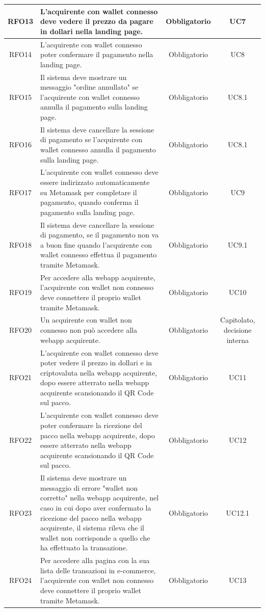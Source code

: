 \documentclass[a4paper, 12pt]{article}
\begin{document}
\begin{longtable}{|c|p{5cm}|c|c|}
\hline
RFO13 & L'acquirente con wallet connesso deve vedere il prezzo da pagare in dollari nella landing page. & Obbligatorio & UC7 \\
\hline
RFO14 & L'acquirente con wallet connesso poter confermare il pagamento nella landing page. & Obbligatorio & UC8 \\
\hline
RFO15 & Il sistema deve mostrare un messaggio "ordine annullato" se l'acquirente con wallet connesso annulla il pagamento sulla landing page. & Obbligatorio & UC8.1 \\
\hline
RFO16 & Il sistema deve cancellare la sessione di pagamento se l'acquirente con wallet connesso annulla il pagamento sulla landing page. & Obbligatorio & UC8.1 \\
\hline
RFO17 & L'acquirente con wallet connesso deve essere indirizzato automaticamente su Metamask per completare il pagamento, quando conferma il pagamento sulla landing page. & Obbligatorio & UC9 \\
\hline
RFO18 & Il sistema deve cancellare la sessione di pagamento, se il pagamento non va a buon fine quando l'acquirente con wallet connesso effettua il pagamento tramite Metamask. & Obbligatorio & UC9.1 \\
\hline
RFO19 & Per accedere alla webapp acquirente, l'acquirente con wallet non connesso deve connettere il proprio wallet tramite Metamask. & Obbligatorio & UC10 \\
\hline
RFO20 & Un acquirente con wallet non connesso non può accedere alla webapp acquirente. & Obbligatorio & Capitolato, decisione interna \\
\hline
RFO21 & L'acquirente con wallet connesso deve poter vedere il prezzo in dollari e in criptovaluta nella webapp acquirente, dopo essere atterrato nella webapp acquirente scansionando il QR Code sul pacco. & Obbligatorio & UC11 \\
\hline
RFO22 & L'acquirente con wallet connesso deve poter confermare la ricezione del pacco nella webapp acquirente, dopo essere atterrato nella webapp acquirente scansionando il QR Code sul pacco. & Obbligatorio & UC12 \\
\hline
RFO23 & Il sistema deve mostrare un messaggio di errore "wallet non corretto" nella webapp acquirente, nel caso in cui dopo aver confermato la ricezione del pacco nella webapp acquirente, il sistema rileva che il wallet non corrisponde a quello che ha effettuato la transazione. & Obbligatorio & UC12.1 \\
\hline
RFO24 & Per accedere alla pagina con la sua lista delle transazioni in e-commerce, l'acquirente con wallet non connesso deve connettere il proprio wallet tramite Metamask. & Obbligatorio & UC13 \\

\end{longtable}
\end{document}
